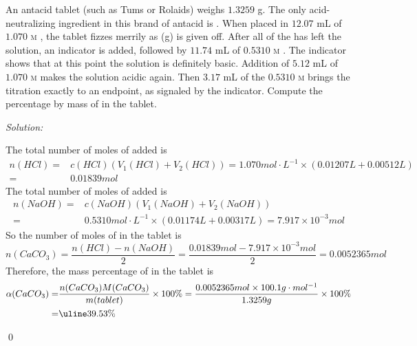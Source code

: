 \documentclass[12pt]{article}
\newenvironment{problem}[2][Problem]{\begin{trivlist}
\item[\hskip \labelsep {\bfseries #1}\hskip \labelsep {\bfseries #2.}]}{\end{trivlist}}
\newenvironment{sol}
    {\emph{Solution:}
    }
    {
    \qed
    }
\begin{document}
\begin{problem}{15.58}
An antacid tablet (such as Tums or Rolaids) weighs $1.3259$ g. The only acid-neutralizing ingredient in this brand of antacid is  . When placed in $12.07$ mL of $1.070$ \textsc{m} , the tablet fizzes merrily as (g) is given off. After all of the  has left the solution, an indicator is added, followed by $11.74$ mL of $0.5310$ \textsc{m} . The indicator shows that at this point the solution is definitely basic. Addition of $5.12$ mL of $1.070$ \textsc{m}  makes the solution acidic again. Then $3.17$ mL of the $0.5310$ \textsc{m}  brings the titration exactly to an endpoint, as signaled by the indicator. Compute the percentage by mass of  in the tablet.
\end{problem}
\begin{sol}
The total number of moles of  added is
\begin{align*}
n(HCl)=&c(HCl)(V_1(HCl)+V_2(HCl))=1.070mol\cdot L^{-1}\times(0.01207L+0.00512L)\\
=&0.01839mol
\end{align*}
The total number of moles of  added is
\begin{align*}
n(NaOH)=&c(NaOH)(V_1(NaOH)+V_2(NaOH))\\
=&0.5310mol\cdot L^{-1}\times(0.01174L+0.00317L)=7.917\times10^{-3}mol
\end{align*}
So the number of moles of  in the tablet is
\[
n(CaCO_3)=\frac{n(HCl)-n(NaOH)}{2}=\frac{0.01839mol-7.917\times10^{-3}mol}{2}=0.0052365mol
\]
Therefore, the mass percentage of  in the tablet is
\begin{align*}
\alpha(CaCO_3)=&\frac{n(CaCO_3)M(CaCO_3)}{m(tablet)}\times100\%=\frac{0.0052365mol\times100.1g\cdot mol^{-1}}{1.3259g}\times100\%\\
=&\uline{39.53\%}
\end{align*}
\end{sol}
\end{document}
